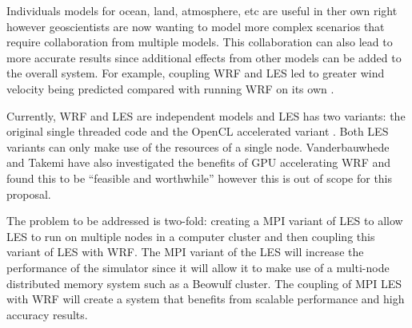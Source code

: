 Individuals models for ocean, land, atmosphere, etc are useful in ther own right
however geoscientists are now wanting to model more complex scenarios that
require collaboration from multiple models. This collaboration can also lead to
more accurate results since additional effects from other models can be added to
the overall system. For example, coupling WRF and LES led to greater wind
velocity being predicted compared with running WRF on its own
\cite{Kinbara2010,Nakayama1998}.

Currently, WRF and LES are independent models and LES has two variants: the
original single threaded code and the OpenCL accelerated variant
\cite{Vanderbauwhede2014}. Both LES variants can only make use of the resources
of a single node. Vanderbauwhede and Takemi \cite{Vanderbauwhede2013} have also
investigated the benefits of GPU accelerating WRF and found this to be
``feasible and worthwhile'' however this is out of scope for this proposal.

The problem to be addressed is two-fold: creating a MPI variant of LES to allow
LES to run on multiple nodes in a computer cluster and then coupling this
variant of LES with WRF. The MPI variant of the LES will increase the
performance of the simulator since it will allow it to make use of a multi-node
distributed memory system such as a Beowulf cluster. The coupling of MPI LES
with WRF will create a system that benefits from scalable performance and high
accuracy results.
